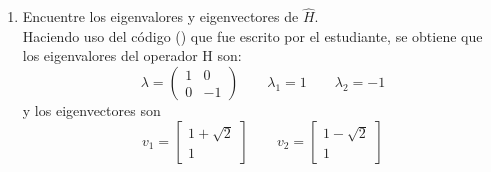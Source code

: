\documentclass[12pt,letterpaper]{report}
\begin{document}
\begin{enumerate}
\begin{align*}
\begin{matrix}
            1 & 0 \\
            0 & 1
        \end{matrix}\right)
    \end{align*}
    calculando $H^*H$:
    \begin{align*}
        H^*H&= \frac{1}{\sqrt{2}} \left(\begin{matrix}
            1 & 1 \\
            1 & -1
        \end{matrix}\right)\frac{1}{\sqrt{2}} \left(\begin{matrix}
            1 & 1 \\
            1 & -1
        \end{matrix}\right)  \\
        & =\frac{1}{2} \left(\begin{matrix}
            2 & 0 \\
            0 & 2
        \end{matrix}\right)\\
        & = \left(\begin{matrix}
            1 & 0 \\
            0 & 1
        \end{matrix}\right)
    \end{align*}
    como $H^*H=HH^*=I$, entonces H es unitaria.
    \item Encuentre los eigenvalores y eigenvectores de $\hat{H}$.\\
    Haciendo uso del código () que fue escrito por el estudiante, se obtiene que los eigenvalores del operador H son:
    \begin{equation*}
        \lambda = \left(\begin{matrix}
            1 & 0\\
            0 &-1
        \end{matrix}\right) \qquad \lambda_1 = 1 \qquad \lambda_2=-1
    \end{equation*}
    y los eigenvectores son
    \begin{equation*}
        v_1=\left[\begin{matrix}
                1+\sqrt{2} \\ 1 
        \end{matrix}\right] \qquad v_2=\left[\begin{matrix}
            1-\sqrt{2} \\ 1 
    \end{matrix}\right]
    \end{equation*}
\end{enumerate}
\end{document}
